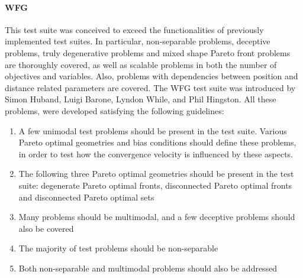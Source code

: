     \paragraph{WFG}
    This test suite \cite{WFGref} was conceived to exceed the functionalities of previously implemented test suites. In particular, non-separable problems, deceptive problems, truly degenerative problems and mixed shape Pareto front problems are thoroughly covered, as well as scalable problems in both the number of objectives and variables. Also, problems with dependencies between position and distance related parameters are covered. The WFG test suite was introduced by Simon Huband, Luigi Barone, Lyndon While, and Phil Hingston. All these problems, were developed satisfying the following guidelines:
        \begin{enumerate}
            \item A few unimodal test problems should be present in the test suite. Various Pareto optimal geometries and bias conditions should define these problems, in order to test how the convergence velocity is influenced by these aspects.
            \item The following three Pareto optimal geometries should be present in the test suite: degenerate Pareto optimal fronts, disconnected Pareto optimal fronts and disconnected Pareto optimal sets
            \item Many problems should be multimodal, and a few deceptive problems should also be covered
            \item The majority of test problems should be non-separable
            \item Both non-separable and multimodal problems should also be addressed
        \end{enumerate}

